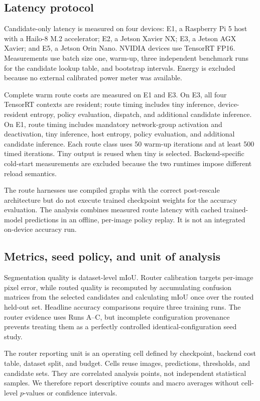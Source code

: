 \documentclass[a4paper,review,12pt]{elsarticle}
\newcommand{\miou}{mIoU}
\begin{document}
\subsection{Latency protocol}

Candidate-only latency is measured on four devices: E1, a Raspberry Pi 5 host with a Hailo-8 M.2 accelerator; E2, a Jetson Xavier NX; E3, a Jetson AGX Xavier; and E5, a Jetson Orin Nano. NVIDIA devices use TensorRT FP16. Measurements use batch size one, warm-up, three independent benchmark runs for the candidate lookup table, and bootstrap intervals. Energy is excluded because no external calibrated power meter was available.

Complete warm route costs are measured on E1 and E3. On E3, all four TensorRT contexts are resident; route timing includes tiny inference, device-resident entropy, policy evaluation, dispatch, and additional candidate inference. On E1, route timing includes mandatory network-group activation and deactivation, tiny inference, host entropy, policy evaluation, and additional candidate inference. Each route class uses 50 warm-up iterations and at least 500 timed iterations. Tiny output is reused when tiny is selected. Backend-specific cold-start measurements are excluded because the two runtimes impose different reload semantics.

The route harnesses use compiled graphs with the correct post-rescale architecture but do not execute trained checkpoint weights for the accuracy evaluation. The analysis combines measured route latency with cached trained-model predictions in an offline, per-image policy replay. It is not an integrated on-device accuracy run.

\subsection{Metrics, seed policy, and unit of analysis}

Segmentation quality is dataset-level \miou{}. Router calibration targets per-image pixel error, while routed quality is recomputed by accumulating confusion matrices from the selected candidates and calculating \miou{} once over the routed held-out set. Headline accuracy comparisons require three training runs. The router evidence uses Runs A--C, but incomplete configuration provenance prevents treating them as a perfectly controlled identical-configuration seed study.

The router reporting unit is an operating cell defined by checkpoint, backend cost table, dataset split, and budget. Cells reuse images, predictions, thresholds, and candidate sets. They are correlated analysis points, not independent statistical samples. We therefore report descriptive counts and macro averages without cell-level $p$-values or confidence intervals.
\end{document}
